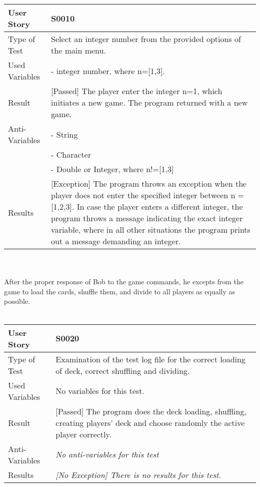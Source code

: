 \begin{tabular}{l | p{12cm}}
User Story & \textbf{S0010}\\ \hline
Type of Test & Select an integer number from the provided options of the main menu.\\ \hline
Used Variables & - integer number, where n=[1,3].\\ \hline
Result & [Passed] The player enter the integer n=1, which initiates a new game. The program returned with a new game.\\ \hline
Anti-Variables & - String\\
& - Character\\
& - Double or Integer, where n!=[1,3]\\
\hline
Results & [Exception] The program throws an exception when the player does not enter the specified integer between n = [1,2,3]. In case the player enters a different integer, the program throws a message indicating the exact integer variable, where in all other situations the program prints out a message demanding an integer.\\ \hline 
\end{tabular}\\
\vspace{0.2cm}\\
After the proper response of Bob to the game commands, he excepts from the game to load the cards, shuffle them, and divide to all players as equally as possible.\\
\vspace{0.2cm}\\
\begin{tabular}{l | p{12cm}}
User Story & \textbf{S0020}\\ \hline
Type of Test & Examination of the test log file for the correct loading of deck, correct shuffling and dividing.\\ \hline
Used Variables & No variables for this test.\\ \hline
Result & [Passed] The program does the deck loading, shuffling, creating players' deck and choose randomly the active player correctly. \\ \hline
Anti-Variables & \textit{No anti-variables for this test} \\ \hline
Results & \textit{[No Exception] There is no results for this test.} \\ \hline
\end{tabular}\\
\vspace{0.2cm}\\
